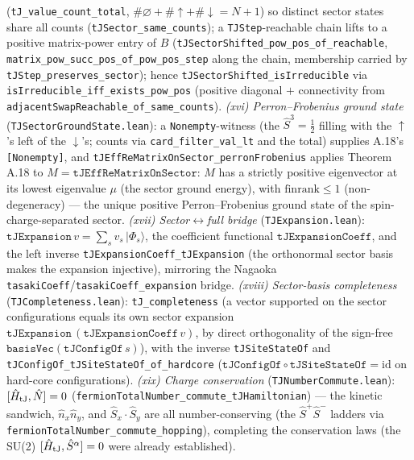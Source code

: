 \documentclass[a4paper,11pt]{article}
\begin{document}
(\texttt{tJ\_value\_count\_total}, $\#\varnothing+\#\!\uparrow+\#\!\downarrow=N+1$) so distinct
sector states share all counts (\texttt{tJSector\_same\_counts}); a \texttt{TJStep}-reachable chain
lifts to a positive matrix-power entry of $B$ (\texttt{tJSectorShifted\_pow\_pos\_of\_reachable},
\texttt{matrix\_pow\_succ\_pos\_of\_pow\_pos\_step} along the chain, membership carried by
\texttt{tJStep\_preserves\_sector}); hence \texttt{tJSectorShifted\_isIrreducible} via
\texttt{isIrreducible\_iff\_exists\_pow\_pos} (positive diagonal $+$ connectivity from
\texttt{adjacentSwapReachable\_of\_same\_counts}).
\emph{(xvi) Perron--Frobenius ground state} (\texttt{TJSectorGroundState.lean}): a
\texttt{Nonempty}-witness (the $\hat S^3=\tfrac12$ filling with the $\uparrow$'s left of the
$\downarrow$'s; counts via \texttt{card\_filter\_val\_lt} and the total) supplies A.18's
\texttt{[Nonempty]}, and \texttt{tJEffReMatrixOnSector\_perronFrobenius} applies Theorem A.18 to
$M=\texttt{tJEffReMatrixOnSector}$: $M$ has a strictly positive eigenvector at its lowest eigenvalue
$\mu$ (the sector ground energy), with $\mathrm{finrank}\leq1$ (non-degeneracy) --- the unique
positive Perron--Frobenius ground state of the spin-charge-separated sector.
\emph{(xvii) Sector$\leftrightarrow$full bridge} (\texttt{TJExpansion.lean}):
$\texttt{tJExpansion}\,v=\sum_s v_s\,|\Phi_s\rangle$, the coefficient functional
$\texttt{tJExpansionCoeff}$, and the left inverse \texttt{tJExpansionCoeff\_tJExpansion} (the
orthonormal sector basis makes the expansion injective), mirroring the Nagaoka
\texttt{tasakiCoeff}/\texttt{tasakiCoeff\_expansion} bridge.
\emph{(xviii) Sector-basis completeness} (\texttt{TJCompleteness.lean}): \texttt{tJ\_completeness} (a
vector supported on the sector configurations equals its own sector expansion
$\texttt{tJExpansion}\,(\texttt{tJExpansionCoeff}\,v)$, by direct orthogonality of the sign-free
$\texttt{basisVec}(\texttt{tJConfigOf}\,s)$), with the inverse \texttt{tJSiteStateOf} and
\texttt{tJConfigOf\_tJSiteStateOf\_of\_hardcore} ($\texttt{tJConfigOf}\circ\texttt{tJSiteStateOf}=
\mathrm{id}$ on hard-core configurations).
\emph{(xix) Charge conservation} (\texttt{TJNumberCommute.lean}): $[\hat H_{\rm tJ},\hat N]=0$
(\texttt{fermionTotalNumber\_commute\_tJHamiltonian}) --- the kinetic sandwich, $\hat n_x\hat n_y$,
and $\hat S_x\!\cdot\!\hat S_y$ are all number-conserving (the $\hat S^+\hat S^-$ ladders via
\texttt{fermionTotalNumber\_commute\_hopping}), completing the conservation laws (the SU(2)
$[\hat H_{\rm tJ},\hat S^\alpha]=0$ were already established).
\end{document}
